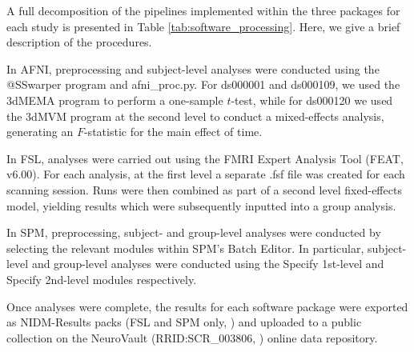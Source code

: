 A full decomposition of the pipelines implemented within the three packages for each study is presented in Table \ref{tab:software_processing}. Here, we give a brief description of the procedures. 

In AFNI, preprocessing and subject-level analyses were conducted using the @SSwarper program and afni\_proc.py. For ds000001 and ds000109, we used the 3dMEMA program to perform a one-sample $t$-test, while for ds000120 we used the 3dMVM program at the second level to conduct a mixed-effects analysis, generating an $F$-statistic for the main effect of time. 

In FSL, analyses were carried out using the FMRI Expert Analysis Tool (FEAT, v6.00). For each analysis, at the first level a separate .fsf file was created for each scanning session. Runs were then combined as part of a second level fixed-effects model, yielding results which were subsequently inputted into a group analysis. 

In SPM, preprocessing, subject- and group-level analyses were conducted by selecting the relevant modules within SPM's Batch Editor. In particular, subject-level and group-level analyses were conducted using the Specify 1st-level and Specify 2nd-level modules respectively. 

Once analyses were complete, the results for each software package were exported as NIDM-Results packs (FSL and SPM only, \citep{Maumet2016-se}) and uploaded to a public collection on the NeuroVault (RRID:SCR\_003806, \citep{Gorgolewski2015-vs}) online data repository. 

